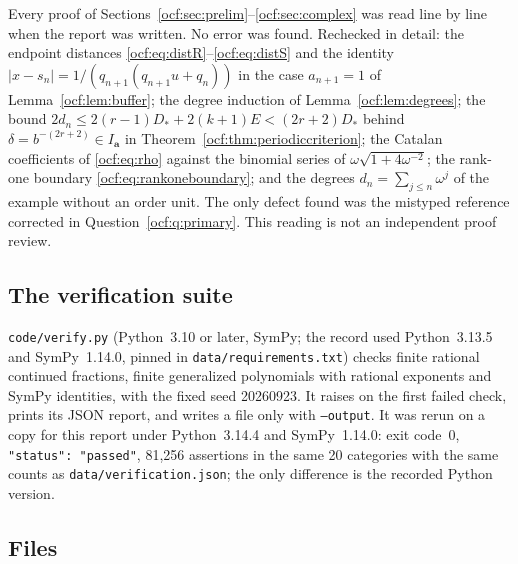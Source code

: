 \documentclass[11pt,a4paper]{article}
\numberwithin{equation}{section}
\theoremstyle{definition}
\theoremstyle{remark}
\newcommand{\codea}{\boldsymbol a}
\newcommand{\rpath}[1]{\nolinkurl{#1}}%
\begin{document}
Every proof of Sections~\ref{ocf:sec:prelim}--\ref{ocf:sec:complex} was read
line by line when the report was written. No error was found. Rechecked in
detail: the endpoint distances \eqref{ocf:eq:distR}--\eqref{ocf:eq:distS}
and the identity $\lvert x-s_n\rvert=1/(q_{n+1}(q_{n+1}u+q_n))$ in the case
$a_{n+1}=1$ of Lemma~\ref{ocf:lem:buffer}; the degree induction of
Lemma~\ref{ocf:lem:degrees}; the bound $2d_n\le2(r-1)D_*+2(k+1)E<(2r+2)D_*$
behind $\delta=b^{-(2r+2)}\in I_{\codea}$ in
Theorem~\ref{ocf:thm:periodiccriterion}; the Catalan coefficients of
\eqref{ocf:eq:rho} against the binomial series of
$\omega\sqrt{1+4\omega^{-2}}$; the rank-one boundary
\eqref{ocf:eq:rankoneboundary}; and the degrees
$d_n=\sum_{j\le n}\omega^j$ of the example without an order unit. The only
defect found was the mistyped reference corrected in
Question~\ref{ocf:q:primary}. This reading is not an independent proof
review.

\subsection{The verification suite}\label{ocf:app:suite}

\rpath{code/verify.py} (Python~3.10 or later, SymPy; the record used
Python~3.13.5 and SymPy~1.14.0, pinned in \rpath{data/requirements.txt})
checks finite rational continued fractions, finite generalized polynomials
with rational exponents and SymPy identities, with the fixed seed
20260923. It raises on the first failed check, prints its JSON report, and
writes a file only with \texttt{--output}. It was rerun on a copy for this
report under Python~3.14.4 and SymPy~1.14.0: exit code~0,
\texttt{"status": "passed"}, 81,256 assertions in the same 20 categories
with the same counts as \rpath{data/verification.json}; the only difference
is the recorded Python version.

\subsection{Files}\label{ocf:app:files}
\end{document}
